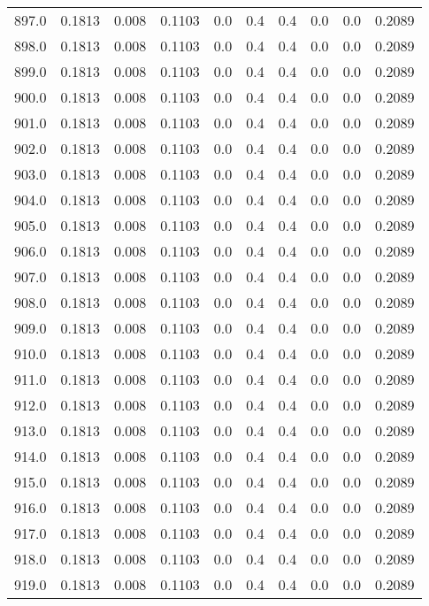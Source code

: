 \begin{longtable}{lrrrrrrrrr}
897.0 & 0.1813 & 0.008 & 0.1103 & 0.0 & 0.4 & 0.4 & 0.0 & 0.0 & 0.2089 \\
898.0 & 0.1813 & 0.008 & 0.1103 & 0.0 & 0.4 & 0.4 & 0.0 & 0.0 & 0.2089 \\
899.0 & 0.1813 & 0.008 & 0.1103 & 0.0 & 0.4 & 0.4 & 0.0 & 0.0 & 0.2089 \\
900.0 & 0.1813 & 0.008 & 0.1103 & 0.0 & 0.4 & 0.4 & 0.0 & 0.0 & 0.2089 \\
901.0 & 0.1813 & 0.008 & 0.1103 & 0.0 & 0.4 & 0.4 & 0.0 & 0.0 & 0.2089 \\
902.0 & 0.1813 & 0.008 & 0.1103 & 0.0 & 0.4 & 0.4 & 0.0 & 0.0 & 0.2089 \\
903.0 & 0.1813 & 0.008 & 0.1103 & 0.0 & 0.4 & 0.4 & 0.0 & 0.0 & 0.2089 \\
904.0 & 0.1813 & 0.008 & 0.1103 & 0.0 & 0.4 & 0.4 & 0.0 & 0.0 & 0.2089 \\
905.0 & 0.1813 & 0.008 & 0.1103 & 0.0 & 0.4 & 0.4 & 0.0 & 0.0 & 0.2089 \\
906.0 & 0.1813 & 0.008 & 0.1103 & 0.0 & 0.4 & 0.4 & 0.0 & 0.0 & 0.2089 \\
907.0 & 0.1813 & 0.008 & 0.1103 & 0.0 & 0.4 & 0.4 & 0.0 & 0.0 & 0.2089 \\
908.0 & 0.1813 & 0.008 & 0.1103 & 0.0 & 0.4 & 0.4 & 0.0 & 0.0 & 0.2089 \\
909.0 & 0.1813 & 0.008 & 0.1103 & 0.0 & 0.4 & 0.4 & 0.0 & 0.0 & 0.2089 \\
910.0 & 0.1813 & 0.008 & 0.1103 & 0.0 & 0.4 & 0.4 & 0.0 & 0.0 & 0.2089 \\
911.0 & 0.1813 & 0.008 & 0.1103 & 0.0 & 0.4 & 0.4 & 0.0 & 0.0 & 0.2089 \\
912.0 & 0.1813 & 0.008 & 0.1103 & 0.0 & 0.4 & 0.4 & 0.0 & 0.0 & 0.2089 \\
913.0 & 0.1813 & 0.008 & 0.1103 & 0.0 & 0.4 & 0.4 & 0.0 & 0.0 & 0.2089 \\
914.0 & 0.1813 & 0.008 & 0.1103 & 0.0 & 0.4 & 0.4 & 0.0 & 0.0 & 0.2089 \\
915.0 & 0.1813 & 0.008 & 0.1103 & 0.0 & 0.4 & 0.4 & 0.0 & 0.0 & 0.2089 \\
916.0 & 0.1813 & 0.008 & 0.1103 & 0.0 & 0.4 & 0.4 & 0.0 & 0.0 & 0.2089 \\
917.0 & 0.1813 & 0.008 & 0.1103 & 0.0 & 0.4 & 0.4 & 0.0 & 0.0 & 0.2089 \\
918.0 & 0.1813 & 0.008 & 0.1103 & 0.0 & 0.4 & 0.4 & 0.0 & 0.0 & 0.2089 \\
919.0 & 0.1813 & 0.008 & 0.1103 & 0.0 & 0.4 & 0.4 & 0.0 & 0.0 & 0.2089 \\

\end{longtable}
